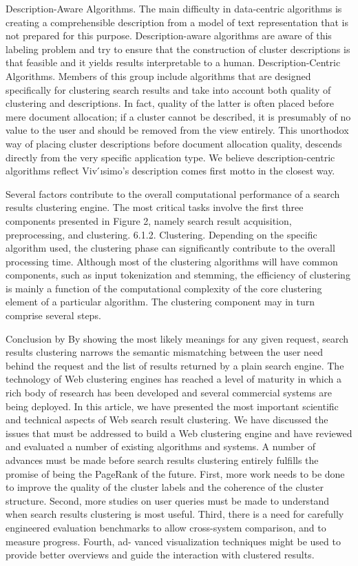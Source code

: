 \documentclass[runningheads]{llncs}
\begin{document}
Description-Aware Algorithms. The main difficulty in data-centric algorithms is creating a comprehensible description from a model of text representation that is not prepared for this purpose. Description-aware algorithms are aware of this labeling problem and try to ensure that the construction of cluster descriptions is that feasible and it yields results interpretable to a human.
Description-Centric Algorithms. Members of this group include algorithms that are designed specifically for clustering search results and take into account both quality of clustering and descriptions. In fact, quality of the latter is often placed before mere document allocation; if a cluster cannot be described, it is presumably of no value to the user and should be removed from the view entirely. This unorthodox way of placing cluster descriptions before document allocation quality, descends directly from the very specific application type. We believe description-centric algorithms reflect Viv ́ısimo’s description comes first motto in the closest way.

\cite{Carpineto} Several factors contribute to the overall computational performance of a search results clustering engine. The most critical tasks involve the first three components presented in Figure 2, namely search result acquisition, preprocessing, and clustering.
6.1.2. Clustering. Depending on the specific algorithm used, the clustering phase can significantly contribute to the overall processing time. Although most of the clustering algorithms will have common components, such as input tokenization and stemming, the efficiency of clustering is mainly a function of the computational complexity of the core clustering element of a particular algorithm. The clustering component may in turn comprise several steps.


Conclusion by \cite{Carpineto} By showing the most likely meanings for any given request, search results clustering narrows the semantic mismatching between the user need behind the request and the list of results returned by a plain search engine. The technology of Web clustering engines has reached a level of maturity in which a rich body of research has been developed and several commercial systems are being deployed.
In this article, we have presented the most important scientific and technical aspects of Web search result clustering. We have discussed the issues that must be addressed to build a Web clustering engine and have reviewed and evaluated a number of existing algorithms and systems.
A number of advances must be made before search results clustering entirely fulfills the promise of being the PageRank of the future. First, more work needs to be done to improve the quality of the cluster labels and the coherence of the cluster structure. Second, more studies on user queries must be made to understand when search results clustering is most useful. Third, there is a need for carefully engineered evaluation benchmarks to allow cross-system comparison, and to measure progress. Fourth, ad- vanced visualization techniques might be used to provide better overviews and guide the interaction with clustered results.
\end{document}
